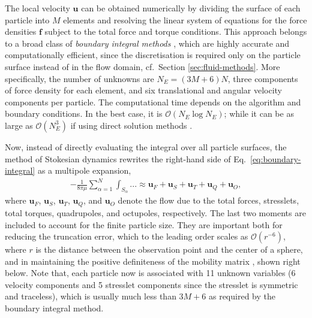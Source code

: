 The local velocity $\bm{u}$ can be obtained numerically by dividing the surface of each particle into $M$ elements and resolving the linear system of equations for the force densities $\bm f$ subject to the total force and torque conditions.
This approach belongs to a broad class of \emph{boundary integral methods} \citep{Pozrikidis}, which are highly accurate and computationally efficient, since the discretisation is required only on the particle surface instead of in the flow domain, cf.\ Section \ref{sec:fluid-methods}.
More specifically, the number of unknowns are $N_E=(3M+6)N$, \ie three components of force density for each element, and six translational and angular velocity components per particle.
The computational time depends on the algorithm and boundary conditions. In the best case, it is $\mathcal{O}(N_E\log N_E)$; while it can be as large as $\mathcal{O}(N_E^3)$ if using direct solution methods \citep{graham_2018}.

Now, instead of directly evaluating the integral over all particle surfaces, the method of Stokesian dynamics \citep{durlofsky_brady_bossis_1987} rewrites the right-hand side of Eq.\ \eqref{eq:boundary-integral} as a multipole expansion, \viz
\begin{equation} \label{eq:sd-multipole}
 \begin{aligned}
  - \frac{1}{8\pi \mu} \sum_{\alpha=1}^N  \int_{S_\alpha} ... \approx \bm{u}_F + \bm{u}_S + \bm{u}_T + \bm{u}_Q + \bm{u}_O , 
 \end{aligned}
\end{equation}
where $\bm{u}_F$, $\bm{u}_S$, $\bm{u}_T$, $\bm{u}_Q$, and $\bm{u}_O$ denote the flow due to the total forces, stresslets, total torques, quadrupoles, and octupoles, respectively.
The last two moments are included to account for the finite particle size. They are important both for reducing the truncation error, which to the leading order scales as $\mathcal{O}(r^{-6})$, where $r$ is the distance between the observation point and the center of a sphere, and in maintaining the positive definiteness of the mobility matrix \citep{durlofsky_brady_bossis_1987}, shown right below.
Note that, each particle now is associated with 11 unknown variables (6 velocity components and 5 stresslet components since the stresslet is symmetric and traceless), which is usually much less than $3M+6$ as required by the boundary integral method.

